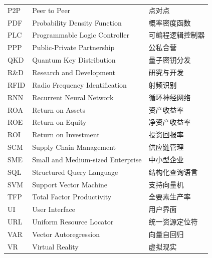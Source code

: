 \begin{longtable}{@{}lll@{}}
    P2P   & Peer to Peer                                   & 点对点 \\
    PDF   & Probability Density Function                   & 概率密度函数 \\
    PLC   & Programmable Logic Controller                  & 可编程逻辑控制器 \\
    PPP   & Public-Private Partnership                     & 公私合营 \\
    QKD   & Quantum Key Distribution                       & 量子密钥分发 \\
    R\&D  & Research and Development                       & 研究与开发 \\
    RFID  & Radio Frequency Identification                 & 射频识别 \\
    RNN   & Recurrent Neural Network                       & 循环神经网络 \\
    ROA   & Return on Assets                               & 资产收益率 \\
    ROE   & Return on Equity                               & 净资产收益率 \\
    ROI   & Return on Investment                           & 投资回报率 \\
    SCM   & Supply Chain Management                        & 供应链管理 \\
    SME   & Small and Medium-sized Enterprise              & 中小型企业 \\
    SQL   & Structured Query Language                      & 结构化查询语言 \\
    SVM   & Support Vector Machine                         & 支持向量机 \\
    TFP   & Total Factor Productivity                      & 全要素生产率 \\
    UI    & User Interface                                 & 用户界面 \\
    URL   & Uniform Resource Locator                       & 统一资源定位符 \\
    VAR   & Vector Autoregression                          & 向量自回归 \\
    VR    & Virtual Reality                                & 虚拟现实 \\
\end{longtable}